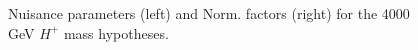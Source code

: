 \begin{figure}[H]
  \centering
  \caption{Nuisance parameters (left) and Norm. factors (right) for the 4000 GeV $H^{+}$ mass hypotheses.}
  \label{fig:Prefit_Hp4000_Blind}
\end{figure}
